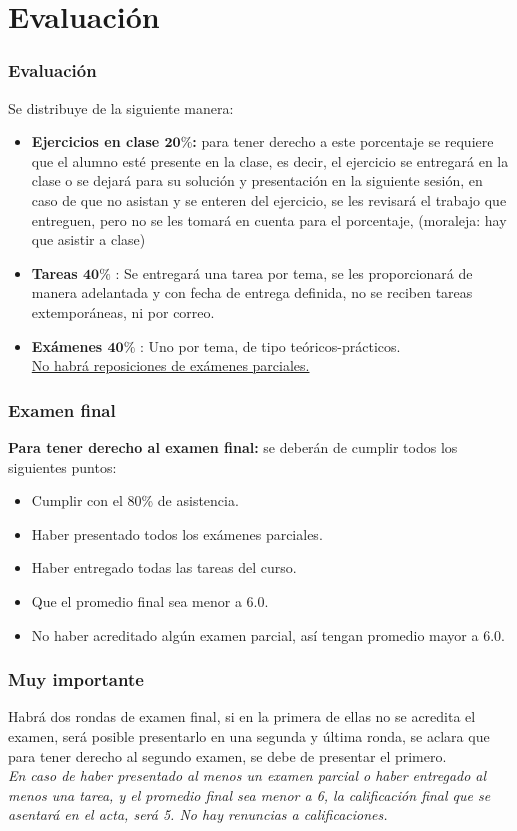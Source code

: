 \documentclass[12pt]{beamer}
\begin{document}
\section{Evaluación}
\begin{frame}
\frametitle{Evaluación}
Se distribuye de la siguiente manera:
\begin{itemize}
\item \textbf{Ejercicios en clase $\mathbf{20\%}$:} para tener derecho a este porcentaje se requiere que el alumno esté presente en la clase, es decir, el ejercicio se entregará en la clase o se dejará para su solución y presentación en la siguiente sesión, en caso de que no asistan y se enteren del ejercicio, se les revisará el trabajo que entreguen, pero no se les tomará en cuenta para el porcentaje, (moraleja: hay que asistir a clase) 
\end{itemize}
\end{frame}
\begin{frame}
\begin{itemize}
\item \textbf{Tareas $\mathbf{40\%}$} : Se entregará una tarea por tema, se les proporcionará de manera adelantada y con fecha de entrega definida, no se reciben tareas extemporáneas, ni por correo.
\item \textbf{Exámenes $\mathbf{40\%}$} : Uno por tema, de tipo teóricos-prácticos. 
\\
\bigskip
\underline{No habrá reposiciones de exámenes parciales.}
\end{itemize}
\end{frame}
\begin{frame}
\frametitle{Examen final}
\textbf{Para tener derecho al examen final:} se deberán de cumplir todos los siguientes puntos:
\begin{itemize}
\item Cumplir con el 80\% de asistencia.
\item Haber presentado todos los exámenes parciales.
\item Haber entregado todas las tareas del curso.
\item Que el promedio final sea menor a $6.0$.
\item No haber acreditado algún examen parcial, así tengan promedio mayor a $6.0$.
\end{itemize}
\end{frame}
\begin{frame}
\frametitle{Muy importante}
Habrá dos rondas de examen final, si en la primera de ellas no se acredita el examen, será posible presentarlo en una segunda y \'{u}ltima ronda, se aclara que para tener derecho al segundo examen, se debe de presentar el primero.
\\
\bigskip
\emph{En caso de haber presentado al menos un examen parcial o haber entregado al menos una tarea, y el promedio final sea menor a 6, la calificación final que se asentará en el acta, será 5. No hay renuncias a calificaciones.}
\end{frame}
\end{document}
